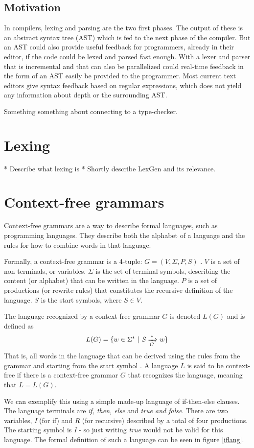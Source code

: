 \documentclass[a4paper,12pt,twosided]{report}
\begin{document}
\subsection{Motivation}
In compilers, lexing and parsing are the two first phases. The output of these
is an abstract syntax tree (AST) which is fed to the next phase of the compiler.
But an AST could also provide useful feedback for programmers, already in their
editor, if the code could be lexed and parsed fast enough. With a lexer and
parser that is incremental and that can also be parallelized could real-time
feedback in the form of an AST easily be provided to the programmer. Most
current text editors give syntax feedback based on regular expressions, which
does not yield any information about depth or the surrounding AST.

Something something about connecting to a type-checker.

\section{Lexing}
* Describe what lexing is
* Shortly describe LexGen and its relevance.

\section{Context-free grammars}
Context-free grammars are a way to describe formal languages, such as
programming languages. They describe both the alphabet of a language and the
rules for how to combine words in that language.

Formally, a context-free grammar is a 4-tuple: $G = (V, \Sigma, P, S)$
\cite[p.171]{automatabook}. $V$ is a set of non-terminals, or variables. $\Sigma$ is
the set of terminal symbols, describing the content (or alphabet) that can be
written in the language.  $P$ is a set of productions (or rewrite rules) that
constitutes the recursive definition of the language. $S$ is the start symbols,
where $S \in V$. 

The language recognized by a context-free grammar $G$ is denoted $L(G)$ and is
defined as 
\[
L(G) = \{w \in \Sigma^* \ |\  S \xRightarrow[G]{*} w\}
\]
That is, all words in the language that can be derived using the rules from the
grammar and starting from the start symbol \cite[p. 177]{automatabook}.  A
language $L$ is said to be context-free if there is a context-free grammar $G$
that recognizes the language, meaning that $L = L(G)$.

We can exemplify this using a simple made-up language of if-then-else clauses.
The language terminals are \textit{if, then, else} and \textit{true and false}.
There are two variables, \textit{I} (for if) and \textit{R} (for recursive)
described by a total of four productions. The starting symbol is \textit{I} - so
just writing \textit{true} would not be valid for this language. The formal
definition of such a language can be seen in figure \ref{iflang}.
\end{document}
